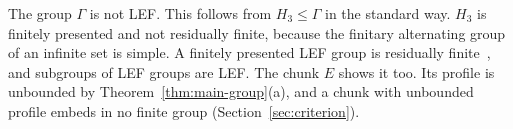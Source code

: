 The group $\Gamma$ is not LEF. This follows from $H_3\le\Gamma$ in the standard way. $H_3$ is finitely presented and not residually finite,
because the finitary alternating group of an infinite set is simple. A finitely presented LEF group is residually
finite~\cite{VershikGordon1997}, and subgroups of LEF groups are LEF. The chunk $E$ shows it too. Its profile is unbounded by
Theorem~\ref{thm:main-group}(a), and a chunk with unbounded profile embeds in no finite group (Section~\ref{sec:criterion}).
